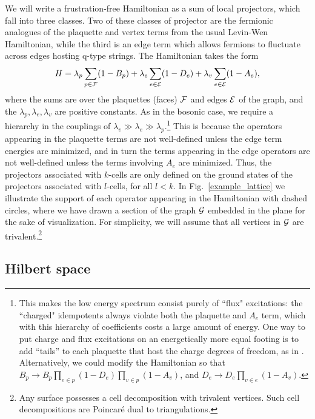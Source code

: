 We will write a frustration-free Hamiltonian as a sum of local projectors, which fall into
three classes.
Two of these classes of projector are the fermionic analogues of the plaquette and vertex terms from the usual Levin-Wen Hamiltonian, 
while the third is an edge term which allows fermions to fluctuate across edges hosting q-type strings.
The Hamiltonian takes the form
\begin{align} \label{ham}
H = \lambda_p \sum_{p \in \mathcal{F}} (1-B_p) + \lambda_e \sum_{e \in \mathcal{E}} (1-D_e) + \lambda_v \sum_{e \in \mathcal{E}} (1-A_e),
\end{align}
where the sums are over the plaquettes (faces) $\mathcal{F}$ and edges $\mathcal{E}$ of the graph, 
and the $\lambda_p,\lambda_e,\lambda_v$ are positive constants.
As in the bosonic case, we require a hierarchy in the couplings of $\lambda_v \gg \lambda_e \gg \lambda_p$.\footnote{
This makes the low energy spectrum consist purely of ``flux" excitations: 
the ``charged" idempotents always violate both the plaquette and $A_e$ term, which with this hierarchy of coefficients costs a large amount of energy. 
One way to put charge and flux excitations on an energetically more equal footing is to add ``tails'' to each 
plaquette that host the charge degrees of freedom, as in \cite{Hu2015}.
Alternatively, we could modify the Hamiltonian so that $B_p \rightarrow B_p \prod_{e \in p} (1-D_e) \prod_{v \in p} (1-A_v)$, and $D_e \rightarrow D_e \prod_{v \in e} (1-A_v)$.
}
This is because the operators appearing in the plaquette terms are not well-defined unless the edge term energies are minimized, and in turn the terms appearing in the edge operators are not well-defined unless the terms involving $A_e$ are minimized.
Thus, the projectors associated with $k$-cells are only defined on the ground states of the projectors associated with $l$-cells, for all $l<k$.  
In Fig.~\ref{example_lattice} we illustrate the support of each operator appearing in the Hamiltonian with dashed circles, where we have drawn a section of the graph $\mathcal{G}$ embedded in the plane for the sake of visualization. 
For simplicity, we will assume that all vertices in $\mathcal{G}$ are trivalent.\footnote{
Any surface possesses a cell decomposition with trivalent vertices.
Such cell decompositions are Poincar\'e dual to triangulations.}




\subsection{Hilbert space} \label{hilbertspacesect}

